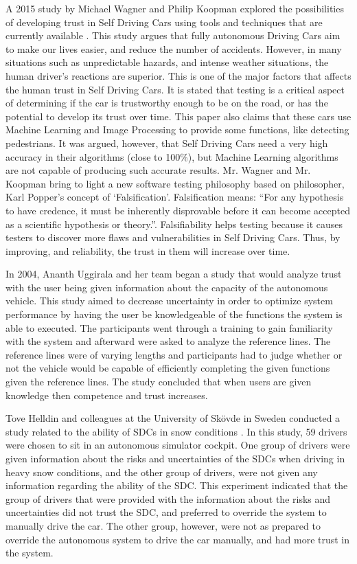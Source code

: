 \documentclass[runningheads,a4paper]{llncs}
\begin{document}
A 2015 study by Michael Wagner and Philip Koopman explored the possibilities of developing trust in Self Driving Cars using tools and techniques that are currently available \cite{wagner2015philosophy}. This study argues that fully autonomous Driving Cars aim to make our lives easier, and reduce the number of accidents. However, in many situations such as unpredictable hazards, and intense weather situations, the human driver's reactions are superior. This is one of the major factors that affects the human trust in Self Driving Cars. It is stated that testing is a critical aspect of determining if the car is trustworthy enough to be on the road, or has the potential to develop its trust over time. This paper also claims that these cars use Machine Learning and Image Processing to provide some functions, like detecting pedestrians. It was argued, however, that Self Driving Cars need a very high accuracy in their algorithms (close to 100\%), but Machine Learning algorithms are not capable of producing such accurate results. Mr. Wagner and Mr. Koopman bring to light a new software testing philosophy based on philosopher, Karl Popper's concept of `Falsification'. Falsification means: ``For any hypothesis to have credence, it must be inherently disprovable before it can become accepted as a scientific hypothesis or theory.''\cite{falsifiability}. Falsifiability helps testing because it causes testers to discover more flaws and vulnerabilities in Self Driving Cars. Thus, by improving, and reliability, the trust in them will increase over time.

In 2004, Ananth Uggirala and her team began a study that would analyze trust with the user being given information about the capacity of the autonomous vehicle\cite{uggirala2004measurement}.  This study aimed to decrease uncertainty in order to optimize system performance by having the user be knowledgeable of the functions the system is able to executed.   The participants went through a training to gain familiarity with the system and afterward were asked to analyze the reference lines.  The reference lines were of varying lengths and participants had to judge whether or not the vehicle would be capable of efficiently completing the given functions given the reference lines.  The study concluded that when users are given knowledge then competence and trust increases.


Tove Helldin and colleagues at the University of Skövde in Sweden conducted a study related to the ability of SDCs in snow conditions \cite{helldin2013presenting}. In this study, 59 drivers were chosen to sit in an autonomous simulator cockpit. One group of drivers were given information about the risks and uncertainties of the SDCs when driving in heavy snow conditions, and the other group of drivers, were not given any information regarding the ability of the SDC. This experiment indicated that the group of drivers that were provided with the information about the risks and uncertainties did not trust the SDC, and preferred to override the system to manually drive the car. The other group, however, were not as prepared to override the autonomous system to drive the car manually, and had more trust in the system.
\end{document}
